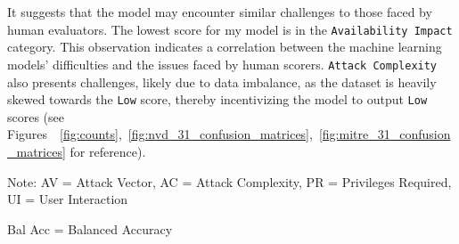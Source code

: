 \documentclass[12pt]{article}
\begin{document}

It suggests that the model may encounter similar challenges to those faced by human
evaluators. The lowest score for my model is in the \texttt{Availability Impact} category. This observation indicates a correlation between the machine learning models'
difficulties and the issues faced by human scorers. \texttt{Attack Complexity} also presents challenges,
likely due to data imbalance, as the dataset is heavily skewed towards the \texttt{Low} score,
thereby incentivizing the model to output \texttt{Low} scores (see
Figures~~\ref{fig:counts},~\ref{fig:nvd_31_confusion_matrices},~\ref{fig:mitre_31_confusion_matrices}
for reference).

\begin{table}[H]
	\centering
	\caption{Comparison of the effects of the pre-trained models on the CVSS v3.1 dataset (Part 1).}
	\label{tab:distil_part1}
	\begin{tablenotes}
		\small
		\item Note: AV = Attack Vector, AC = Attack Complexity, PR = Privileges Required, UI = User Interaction
		\item Bal Acc = Balanced Accuracy
	\end{tablenotes}
\end{table}
\end{document}
